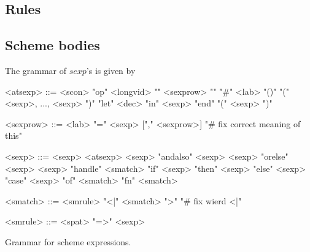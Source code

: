 \subsection{Rules}





\subsection{Scheme bodies}

The grammar of $sexp$'s is given by

\begin{nonfloatingfigure}

\setlength{\grammarindent}{7.3em}
\begin{grammar}
 
  <atsexp> ::= <scon> \alt "op" <longvid> \alt "{" <sexprow> "}" \alt "\#"
  <lab> \alt "()" \alt "(" <sexp>, ..., <sexp> ")" \alt "let" <dec> "in"
  <sexp> "end" \alt "(" <sexp> ")"
  
  <sexprow> ::= <lab> "=" <sexp> ["," <sexprow>] "\# fix correct meaning of this"
  
  <sexp> ::= <sexp> <atsexp> \alt <sexp> "andalso" <sexp> \alt <sexp> "orelse"
  <sexp> \alt <sexp> "handle" <smatch> \alt "if" <sexp> "then" <sexp> "else"
  <sexp> \alt "case" <sexp> "of" <smatch> \alt "fn" <smatch>
  
  <smatch> ::= <smrule> "<|" <smatch> ">" "\# fix wierd <|"
  
  <smrule> ::= <spat> "=>" <sexp>
\end{grammar}
  
  \caption{Grammar for scheme expressions.}
  \label{fig:scheme-expressions}
\end{nonfloatingfigure}








